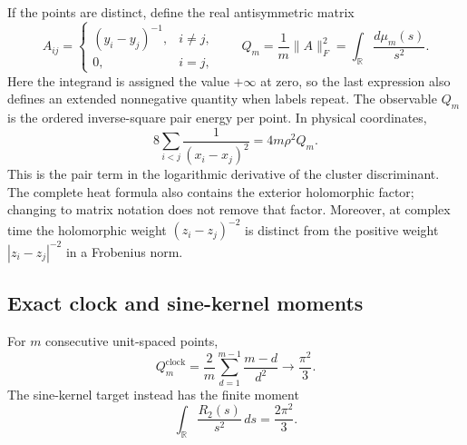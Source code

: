 If the points are distinct, define the real antisymmetric matrix
\begin{equation}
 A_{ij}=\begin{cases}(y_i-y_j)^{-1},&i\ne j,\\0,&i=j,\end{cases}
 \qquad
 Q_m=\frac1m\lVert A\rVert_F^2
     =\int_{\mathbb R}\frac{d\mu_m(s)}{s^2}.
 \label{sc:matrixenergy}
\end{equation}
Here the integrand is assigned the value $+\infty$ at zero, so the last
expression also defines an extended nonnegative quantity when labels
repeat. The observable $Q_m$ is the ordered inverse-square pair energy
per point. In physical coordinates,
\begin{equation}
 8\sum_{i<j}\frac1{(x_i-x_j)^2}=4m\rho^2Q_m.
 \label{sc:physicalweight}
\end{equation}
This is the pair term in the logarithmic derivative of the cluster
discriminant. The complete heat formula also contains the exterior
holomorphic factor; changing to matrix notation does not remove that
factor. Moreover, at complex time the holomorphic weight
$(z_i-z_j)^{-2}$ is distinct from the positive weight
$|z_i-z_j|^{-2}$ in a Frobenius norm.

\subsection{Exact clock and sine-kernel moments}
\label{sc:moments}

\begin{proposition}
\label{sc:targets}
For $m$ consecutive unit-spaced points,
\begin{equation}
 Q_m^{\mathrm{clock}}=
 \frac2m\sum_{d=1}^{m-1}\frac{m-d}{d^2}
 \longrightarrow\frac{\pi^2}{3}.
 \label{sc:clockmoment}
\end{equation}
The sine-kernel target instead has the finite moment
\begin{equation}
 \int_{\mathbb R}\frac{R_2(s)}{s^2}\,ds=
 \frac{2\pi^2}{3}.
 \label{sc:sinemoment}
\end{equation}
\end{proposition}

